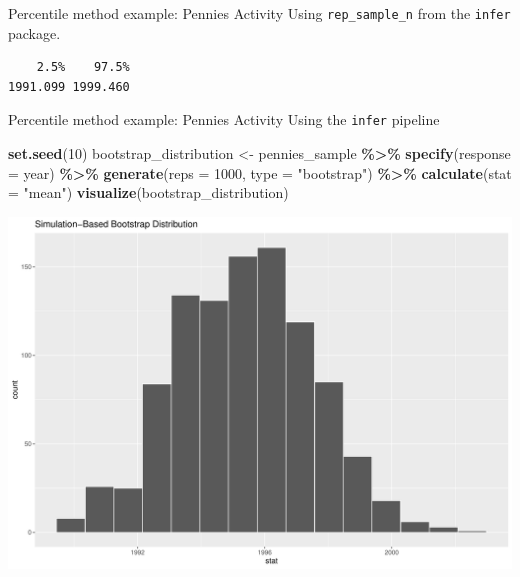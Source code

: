 \documentclass[
  ignorenonframetext,
]{beamer}
\newenvironment{Shaded}{\begin{snugshade}}{\end{snugshade}}
\newcommand{\AttributeTok}[1]{\textcolor[rgb]{0.13,0.29,0.53}{#1}}
\newcommand{\DecValTok}[1]{\textcolor[rgb]{0.00,0.00,0.81}{#1}}
\newcommand{\FloatTok}[1]{\textcolor[rgb]{0.00,0.00,0.81}{#1}}
\newcommand{\FunctionTok}[1]{\textcolor[rgb]{0.13,0.29,0.53}{\textbf{#1}}}
\newcommand{\NormalTok}[1]{#1}
\newcommand{\OtherTok}[1]{\textcolor[rgb]{0.56,0.35,0.01}{#1}}
\newcommand{\SpecialCharTok}[1]{\textcolor[rgb]{0.81,0.36,0.00}{\textbf{#1}}}
\newcommand{\StringTok}[1]{\textcolor[rgb]{0.31,0.60,0.02}{#1}}
\begin{document}
\begin{frame}[fragile]{Percentile method example: Pennies Activity}
\protect\hypertarget{percentile-method-example-pennies-activity-1}{}
Using \texttt{rep\_sample\_n} from the \texttt{infer} package.

\begin{Shaded}
\end{Shaded}

\begin{verbatim}
    2.5%    97.5% 
1991.099 1999.460 
\end{verbatim}
\end{frame}

\begin{frame}[fragile]{Percentile method example: Pennies Activity}
\protect\hypertarget{percentile-method-example-pennies-activity-2}{}
Using the \texttt{infer} pipeline

\tiny

\begin{Shaded}
\begin{Highlighting}[]
\FunctionTok{set.seed}\NormalTok{(}\DecValTok{10}\NormalTok{)}
\NormalTok{bootstrap\_distribution }\OtherTok{\textless{}{-}}\NormalTok{ pennies\_sample }\SpecialCharTok{\%\textgreater{}\%} 
  \FunctionTok{specify}\NormalTok{(}\AttributeTok{response =}\NormalTok{ year) }\SpecialCharTok{\%\textgreater{}\%} 
  \FunctionTok{generate}\NormalTok{(}\AttributeTok{reps =} \DecValTok{1000}\NormalTok{, }\AttributeTok{type =} \StringTok{"bootstrap"}\NormalTok{) }\SpecialCharTok{\%\textgreater{}\%} 
  \FunctionTok{calculate}\NormalTok{(}\AttributeTok{stat =} \StringTok{"mean"}\NormalTok{)}
\FunctionTok{visualize}\NormalTok{(bootstrap\_distribution)}
\end{Highlighting}
\end{Shaded}

\begin{center}\includegraphics[width=0.7\linewidth,height=0.5\textheight]{Week10A_files/figure-beamer/unnamed-chunk-14-1} \end{center}
\normalsize
\end{frame}
\end{document}
